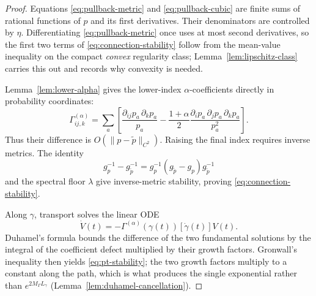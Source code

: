 \documentclass[11pt]{article}
\theoremstyle{definition}
\theoremstyle{remark}
\begin{document}
\begin{proof}
Equations \eqref{eq:pullback-metric} and \eqref{eq:pullback-cubic} are finite sums of rational functions of $p$ and its first derivatives. Their denominators are controlled by $\eta$. Differentiating \eqref{eq:pullback-metric} once uses at most second derivatives, so the first two terms of \eqref{eq:connection-stability} follow from the mean-value inequality on the compact \emph{convex} regularity class; Lemma~\ref{lem:lipschitz-class} carries this out and records why convexity is needed.

Lemma~\ref{lem:lower-alpha} gives the lower-index $\alpha$-coefficients directly
in probability coordinates:
\begin{equation}
    \Gamma^{(\alpha)}_{ij,k}
    =\sum_a\left[
    \frac{\partial_{ij}p_a\,\partial_kp_a}{p_a}
    -\frac{1+\alpha}{2}
    \frac{\partial_ip_a\,\partial_jp_a\,\partial_kp_a}{p_a^2}
    \right].
    \label{eq:lower-alpha}
\end{equation}
Thus their difference is $O(\|p-\widetilde p\|_{C^2})$. Raising the final index requires inverse metrics. The identity
\begin{equation}
    g_p^{-1}-g_{\widetilde p}^{-1}
    =g_p^{-1}(g_{\widetilde p}-g_p)g_{\widetilde p}^{-1}
\end{equation}
and the spectral floor $\lambda$ give inverse-metric stability, proving \eqref{eq:connection-stability}.

Along $\gamma$, transport solves the linear ODE
\begin{equation}
    \dot V(t)=-\Gamma^{(\alpha)}(\gamma(t))[\dot\gamma(t)]V(t).
\end{equation}
Duhamel's formula bounds the difference of the two fundamental solutions by the integral of the coefficient defect multiplied by their growth factors. Gronwall's inequality then yields \eqref{eq:pt-stability}; the two growth factors multiply to a constant along the path, which is what produces the single exponential rather than $e^{2M_\Gamma L_\gamma}$ (Lemma~\ref{lem:duhamel-cancellation}).
\end{proof}
\end{document}
